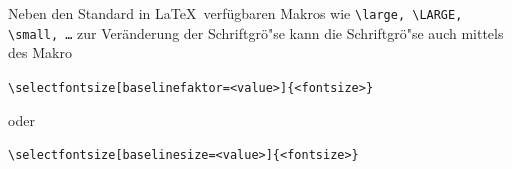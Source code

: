 \documentclass[11pt, rgb]{scrreprt}
\begin{document}

%
%
%
%
%
%
% 
%
%
%
%                    
%
%
%

\noindent Neben den Standard in \LaTeX~verfügbaren Makros wie \texttt{\textbackslash large, \textbackslash LARGE, \textbackslash small, \ldots} zur Veränderung der Schriftgrö"se kann die Schriftgrö"se auch mittels des Makro

\begin{center}
\texttt{\textbackslash selectfontsize[baselinefaktor=<value>]\{<fontsize>\}}
\end{center}

\noindent oder

\begin{center}
\texttt{\textbackslash selectfontsize[baselinesize=<value>]\{<fontsize>\}}
\end{center}
\end{document}

